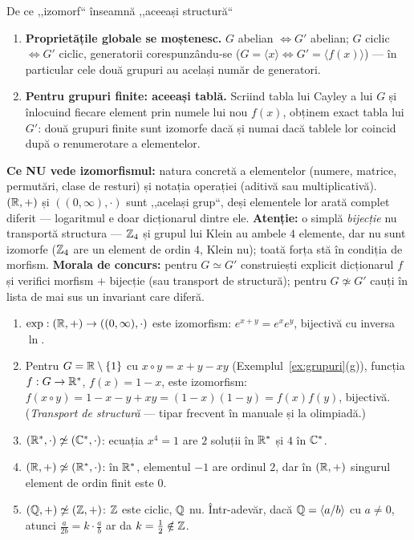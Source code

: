 \begin{tehbox}{De ce ,,izomorf`` înseamnă ,,aceeași structură``}
\begin{enumerate}[leftmargin=*, itemsep=1pt]
\item \textbf{Proprietățile globale se moștenesc.} $G$ abelian $\iff G'$ abelian; $G$ ciclic $\iff G'$ ciclic, generatorii corespunzându-se ($G=\langle x\rangle\iff G'=\langle f(x)\rangle$) --- în particular cele două grupuri au același număr de generatori.
\item \textbf{Pentru grupuri finite: aceeași tablă.} Scriind tabla lui Cayley a lui $G$ și înlocuind fiecare element prin numele lui nou $f(x)$, obținem exact tabla lui $G'$: două grupuri finite sunt izomorfe dacă și numai dacă tablele lor coincid după o renumerotare a elementelor.
\end{enumerate}
\textbf{Ce NU vede izomorfismul:} natura concretă a elementelor (numere, matrice, permutări, clase de resturi) și notația operației (aditivă sau multiplicativă). $(\mathbb{R},+)$ și $((0,\infty),\cdot)$ sunt ,,același grup``, deși elementele lor arată complet diferit --- logaritmul e doar dicționarul dintre ele. \textbf{Atenție:} o simplă \emph{bijecție} nu transportă structura --- $\mathbb{Z}_4$ și grupul lui Klein au ambele $4$ elemente, dar nu sunt izomorfe ($\mathbb{Z}_4$ are un element de ordin $4$, Klein nu); toată forța stă în condiția de morfism. \textbf{Morala de concurs:} pentru $G\simeq G'$ construiești explicit dicționarul $f$ și verifici morfism $+$ bijecție (sau transport de structură); pentru $G\not\simeq G'$ cauți în lista de mai sus un invariant care diferă.
\end{tehbox}

\begin{exemplu}\label{ex:noniso}
\begin{enumerate}[label=(\alph*),nosep]
\item $\exp:(\mathbb{R},+)\to((0,\infty),\cdot)$ este izomorfism: $e^{x+y}=e^xe^y$, bijectivă cu inversa $\ln$.
\item Pentru $G=\mathbb{R}\setminus\{1\}$ cu $x\circ y=x+y-xy$ (Exemplul~\ref{ex:grupuri}(g)), funcția $f:G\to\mathbb{R}^*$, $f(x)=1-x$, este izomorfism: $f(x\circ y)=1-x-y+xy=(1-x)(1-y)=f(x)f(y)$, bijectivă. (\emph{Transport de structură} --- tipar frecvent în manuale și la olimpiadă.)
\item $(\mathbb{R}^*,\cdot)\not\simeq(\mathbb{C}^*,\cdot)$: ecuația $x^4=1$ are $2$ soluții în $\mathbb{R}^*$ și $4$ în $\mathbb{C}^*$.
\item $(\mathbb{R},+)\not\simeq(\mathbb{R}^*,\cdot)$: în $\mathbb{R}^*$, elementul $-1$ are ordinul $2$, dar în $(\mathbb{R},+)$ singurul element de ordin finit este $0$.
\item $(\mathbb{Q},+)\not\simeq(\mathbb{Z},+)$: $\mathbb{Z}$ este ciclic, $\mathbb{Q}$ nu. Într-adevăr, dacă $\mathbb{Q}=\langle a/b\rangle$ cu $a\neq0$, atunci $\frac{a}{2b}=k\cdot\frac ab$ ar da $k=\frac12\notin\mathbb{Z}$.
\end{enumerate}
\end{exemplu}

